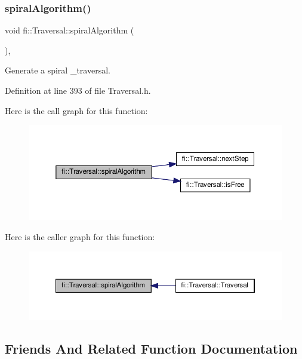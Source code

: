 \subsubsection{\texorpdfstring{spiral\+Algorithm()}{spiralAlgorithm()}}
{\footnotesize\ttfamily void fi\+::\+Traversal\+::spiral\+Algorithm (\begin{DoxyParamCaption}{ }\end{DoxyParamCaption})\hspace{0.3cm}{\ttfamily [inline]}, {\ttfamily [private]}}



Generate a spiral \+\_\+traversal. 



Definition at line 393 of file Traversal.\+h.

Here is the call graph for this function\+:
\nopagebreak
\begin{figure}[H]
\begin{center}
\leavevmode
\includegraphics[width=350pt]{d8/d0e/classfi_1_1Traversal_af932ac9b0af7fb02dee64fd544229597_cgraph}
\end{center}
\end{figure}
Here is the caller graph for this function\+:
\nopagebreak
\begin{figure}[H]
\begin{center}
\leavevmode
\includegraphics[width=350pt]{d8/d0e/classfi_1_1Traversal_af932ac9b0af7fb02dee64fd544229597_icgraph}
\end{center}
\end{figure}


\subsection{Friends And Related Function Documentation}
\mbox{\label{classfi_1_1Traversal_a3d8a47748a3e073d8f0d91ad4ce2f880}} 
